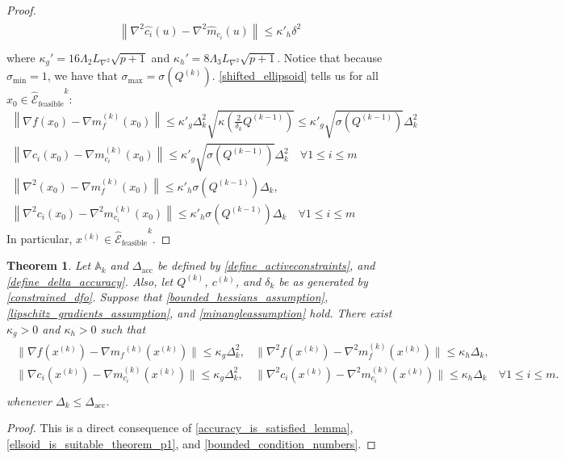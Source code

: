 \documentclass{article}
\newtheorem{theorem}{Theorem}[section]
\theoremstyle{case}
\numberwithin{theorem}{subsection}
\newcommand{\activeconstraintsk}{{\mathbb A_{k}}}
\newcommand{\ck}{{c^{(k)}}}
\newcommand{\dacc}{{\Delta_{\textrm{acc}}}}
\newcommand{\dk}{\Delta_k}
\newcommand{\gmcik}{{\nabla m_{c_i}^{(k)}\left(\xk\right)}}
\newcommand{\gradf}{\nabla f}
\newcommand{\hk}{{\nabla^2m_f^{(k)}(x^{(k)})}}
\newcommand{\liphess}{{L_{\nabla^2}}}
\newcommand{\mfk}{{{m}_f}^{(k)}}
\newcommand{\qk}{{Q^{(k)}}}
\newcommand{\scaledunshiftedellipsoid}{{{\mathcal {\hat E}_{\text{feasible}}}^k}}
\newcommand{\sdk}{{\delta_k}}
\newcommand{\sigmamax}{{\sigma_{\textrm{max}}}}
\newcommand{\xk}{{x^{(k)}}}
\newcommand{\qkmo}{{Q^{(k-1)}}}
\begin{document}
\begin{proof}
\begin{align*}
\begin{array}{cc}
\left\|\nabla^2 \hat {c_i}\left(u\right) - \nabla^2 \hat{m}_{c_i}\left(u\right) \right\|\le {\kappa'}_h\delta^2 \\
\end{array}
\end{align*}
where $\kappa_{g}' = 16 \Lambda_2 \liphess \sqrt{p+1}$ and $\kappa_{h}' = 8 \Lambda_3 \liphess \sqrt{p+1}$.
Notice that because $\sigma_{\textrm{min}} = 1$, we have that $\sigmamax = \sigma \left(\qk\right)$.
\cref{shifted_ellipsoid} tells us for all $x_0 \in \scaledunshiftedellipsoid$:
\begin{align*}
\left\|\gradf\left(x_0 \right) - \nabla m^{(k)}_f\left(x_0\right)\right\| \le 
\kappa'_g  \dk^2 \sqrt{\kappa\left(\frac 2 {\sdk} \qkmo\right)} \le \kappa'_g \sqrt{\sigma\left(\qkmo\right)}\dk^2 \\
\left\|\nabla {c_i}\left(x_0 \right) - \nabla m^{(k)}_{c_i}\left(x_0\right)\right\| \le \kappa'_g\sqrt{\sigma\left(\qkmo\right)} \dk^2 \quad \forall 1 \le i \le m \\
\left\|\nabla^2\left(x_0 \right) - \nabla m^{(k)}_f\left(x_0\right)\right\| \le \kappa'_h\sigma\left(\qkmo\right)\dk, \\
\left\|\nabla^2 {c_i}\left(x_0 \right) - \nabla^2 m^{(k)}_{c_i}\left(x_0\right)\right\| \le \kappa'_h\sigma\left(\qkmo\right)\dk \quad \forall 1 \le i \le m
\end{align*}
In particular, $\xk \in \scaledunshiftedellipsoid$.
\end{proof}


\begin{theorem}
\label{accuracy_is_satisfied}
Let $\activeconstraintsk$ and $\dacc$ be defined by \cref{define_activeconstraints}, and \cref{define_delta_accuracy}.
Also, let $\qk$, $\ck$, and $\sdk$ 
be as generated by \cref{constrained_dfo}.
Suppose that 
\cref{bounded_hessians_assumption}, \cref{lipschitz_gradients_assumption}, and \cref{minangleassumption} hold.
There exist $\kappa_g>0$ and $\kappa_h>0$ such that
\begin{align*}
\begin{array}{ccc}
\|\gradf(\xk) - \nabla \mfk(\xk) \| \le \kappa_g \dk^2, & \|\nabla^2 f(\xk) - \hk \| \le \kappa_h \dk, & \\
\|\nabla c_i(\xk) - \gmcik \| \le \kappa_g \dk^2, & \|\nabla^2 c_i(\xk) - \nabla^2 m_{c_i}^{(k)}(\xk) \| \le \kappa_h \dk & \forall 1 \le i \le m. \\
\end{array}
\end{align*}
whenever $\dk \le \dacc$.
\end{theorem}
\begin{proof}
This is a direct consequence of \cref{accuracy_is_satisfied_lemma}, \cref{ellsoid_is_suitable_theorem_p1}, and \cref{bounded_condition_numbers}.
\end{proof}
\end{document}
